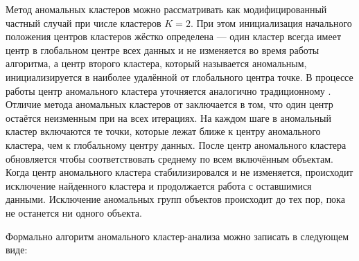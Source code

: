 \documentclass[12pt]{diploma}
\begin{document}
	Метод аномальных кластеров можно рассматривать как модифицированный частный случай \kmeans при числе кластеров $ K=2 $. При этом инициализация начального положения центров кластеров жёстко определена --- один кластер всегда имеет центр в глобальном центре всех данных и не изменяется во время работы алгоритма, а центр второго кластера, который называется аномальным, инициализируется в наиболее удалённой от глобального центра точке. В процессе работы центр аномального кластера уточняется аналогично традиционному \kmeans. Отличие метода аномальных кластеров от \kmeans заключается в том, что один центр остаётся неизменным при на всех итерациях. На каждом шаге в аномальный кластер включаются те точки, которые лежат ближе к центру аномального кластера, чем к глобальному центру данных. После центр аномального кластера обновляется чтобы соответствовать среднему по всем включённым объектам. Когда центр аномального кластера стабилизировался и не изменяется, происходит исключение найденного кластера и продолжается работа с оставшимися данными. Исключение аномальных групп объектов происходит до тех пор, пока не останется ни одного объекта. 
	
	Формально алгоритм аномального кластер-анализа можно записать в следующем виде:
	
\end{document}
